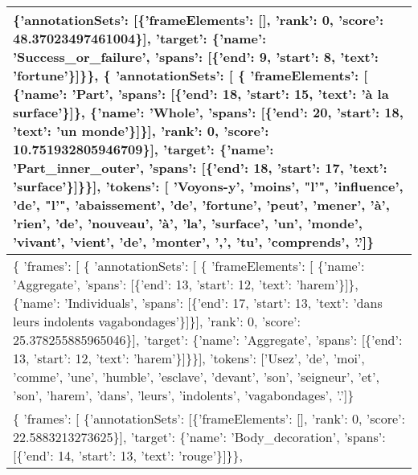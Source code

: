 \documentclass{article}%
\begin{document}
\begin{longtable}{|p{15.5cm}|}
              \{'annotationSets': {[}\{'frameElements': {[}{]}, 'rank': 0, 'score': 48.37023497461004\}{]}, 'target': \{'name': 'Success\_or\_failure', 'spans': {[}\{'end': 9, 'start': 8, 'text': 'fortune'\}{]}\}\},\newline%
              \{ 'annotationSets': {[} \{ 'frameElements': {[} \{'name': 'Part', 'spans': {[}\{'end': 18, 'start': 15, 'text': 'à la surface'\}{]}\},\newline%
                                                         \{'name': 'Whole', 'spans': {[}\{'end': 20, 'start': 18, 'text': 'un monde'\}{]}\}{]},\newline%
                                      'rank': 0,\newline%
                                      'score': 10.751932805946709\}{]},\newline%
                'target': \{'name': 'Part\_inner\_outer', 'spans': {[}\{'end': 18, 'start': 17, 'text': 'surface'\}{]}\}\}{]},\newline%
  'tokens': {[} 'Voyons{-}y', 'moins', "l'", 'influence', 'de', "l'", 'abaissement', 'de', 'fortune', 'peut', 'mener', 'à', 'rien', 'de', 'nouveau', 'à', 'la', 'surface', 'un', 'monde', 'vivant', 'vient',\newline%
              'de', 'monter', ',', 'tu', 'comprends', '.'{]}\}\\%
\hline%
\{ 'frames': {[} \{ 'annotationSets': {[} \{ 'frameElements': {[} \{'name': 'Aggregate', 'spans': {[}\{'end': 13, 'start': 12, 'text': 'harem'\}{]}\},\newline%
                                                         \{'name': 'Individuals', 'spans': {[}\{'end': 17, 'start': 13, 'text': 'dans leurs indolents vagabondages'\}{]}\}{]},\newline%
                                      'rank': 0,\newline%
                                      'score': 25.378255885965046\}{]},\newline%
                'target': \{'name': 'Aggregate', 'spans': {[}\{'end': 13, 'start': 12, 'text': 'harem'\}{]}\}\}{]},\newline%
  'tokens': {[}'Usez', 'de', 'moi', 'comme', 'une', 'humble', 'esclave', 'devant', 'son', 'seigneur', 'et', 'son', 'harem', 'dans', 'leurs', 'indolents', 'vagabondages', '.'{]}\}\\%
\hline%
\{ 'frames': {[} \{'annotationSets': {[}\{'frameElements': {[}{]}, 'rank': 0, 'score': 22.5883213273625\}{]}, 'target': \{'name': 'Body\_decoration', 'spans': {[}\{'end': 14, 'start': 13, 'text': 'rouge'\}{]}\}\},\newline%

\end{longtable}
\end{document}
